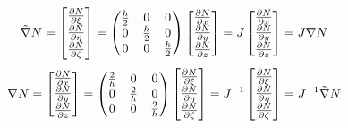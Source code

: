 \documentclass[11pt]{article}
\newcommand{\nx}{\frac{\partial N}{\partial x}}
\newcommand{\ny}{\frac{\partial N}{\partial y}}
\newcommand{\nz}{\frac{\partial N}{\partial z}}
\newcommand{\nxi}{\frac{\partial N}{\partial \xi}}
\newcommand{\neta}{\frac{\partial N}{\partial \eta}}
\newcommand{\nzeta}{\frac{\partial N}{\partial \zeta}}
\begin{document}
\begin{enumerate}
    \begin{equation*}
    \tilde{\nabla} N =
    \left[
    \begin{array}{@{}c@{}}
    \nxi\\
    \neta\\
    \nzeta
    \end{array}
    \right] =
    \begin{pmatrix}
    \frac{h}{2} & 0  & 0   \\
    0 & \frac{h}{2} & 0   \\
    0 & 0 & \frac{h}{2}
    \end{pmatrix}
    \left[
    \begin{array}{@{}c@{}}
    \nx\\
    \ny\\
    \nz
    \end{array}
    \right] =
    J \left[
    \begin{array}{@{}c@{}}
    \nx\\
    \ny\\
    \nz
    \end{array}
    \right] = J \nabla N
    \end{equation*}
    \begin{equation*}
    \nabla N =
    \left[
    \begin{array}{@{}c@{}}
    \nx\\
    \ny\\
    \nz
    \end{array}
    \right] =
    \begin{pmatrix}
    \frac{2}{h} & 0  & 0   \\
    0 & \frac{2}{h} & 0   \\
    0 & 0 & \frac{2}{h}
    \end{pmatrix}
    \left[
    \begin{array}{@{}c@{}}
    \nxi\\
    \neta\\
    \nzeta
    \end{array}
    \right] =
    J^{-1}
    \left[
    \begin{array}{@{}c@{}}
    \nxi\\
    \neta\\
    \nzeta
    \end{array}
    \right] = J^{-1} \tilde{\nabla}N
    \end{equation*}


\end{enumerate}
\end{document}
